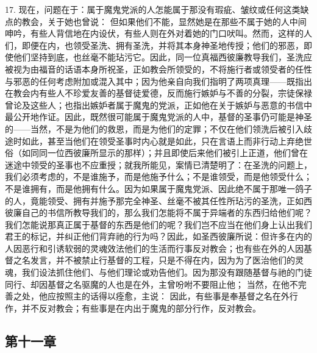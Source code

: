 17. 现在，问题在于：属于魔鬼党派的人怎能属于那没有瑕疵、皱纹或任何这类缺点的教会，关于她也曾说： 但如果他们不能，显然她是在那些不属于她的人中间呻吟，有些人背信地在内设伏，有些人则在外对着她的门口吠叫。然而，这样的人们，即便在内，也领受圣洗、拥有圣洗，并将其本身神圣地传授；他们的邪恶，即使他们坚持到底，也丝毫不能玷污它。因此，同一位真福西彼廉教导我们，圣洗应被视为由福音的话语本身所祝圣，正如教会所领受的，不将施行者或领受者的任性与邪恶的任何考虑附加或混入其中；因为他亲自向我们指明了两项真理——既指出在教会内有些人不珍爱友善的基督徒爱德，反而施行嫉妒与不善的分裂，宗徒保禄曾论及这些人；也指出嫉妒者属于魔鬼的党派，正如他在关于嫉妒与恶意的书信中最公开地作证。因此，既然很可能属于魔鬼党派的人中，基督的圣事仍可能是神圣的——当然，不是为他们的救恩，而是为他们的定罪；不仅在他们领洗后被引入歧途时如此，甚至当他们在领受圣事时内心就是如此，只在言语上而非行动上弃绝世俗（如同同一位西彼廉所显示的那样）；并且即使后来他们被引上正道，他们曾在迷途中领受的圣事也不应重授；就我所能见，案情已清楚明了：在圣洗的问题上，我们必须考虑的，不是谁施予，而是他施予什么；不是谁领受，而是他领受什么；不是谁拥有，而是他拥有什么。因为如果属于魔鬼党派、因此绝不属于那唯一鸽子的人，竟能领受、拥有并施予那完全神圣、丝毫不被其任性所玷污的圣洗，正如西彼廉自己的书信所教导我们的，那么我们怎能将不属于异端者的东西归给他们呢？我们怎能说那真正属于基督的东西是他们的呢？我们岂不应当在他们身上认出我们君王的标记，并纠正他们背弃祂的行为吗？因此，如圣西彼廉所说：但许多在内的人因恶行和引诱软弱的灵魂效法他们的生活而行事反对教会；也有些在外的人因基督之名发言，并不被禁止行基督的工程，只是不得在内，因为为了医治他们的灵魂，我们设法抓住他们、与他们理论或劝告他们。因为那没有跟随基督与祂的门徒同行、却因基督之名驱魔的人也是在外，主曾吩咐不要阻止他； 当然，在他不完善之处，他应按照主的话得以痊愈，主说： 因此，有些事是奉基督之名在外行作，并不反对教会；有些事是在内出于魔鬼的部分行作，反对教会。\par


\subsection{第十一章}

